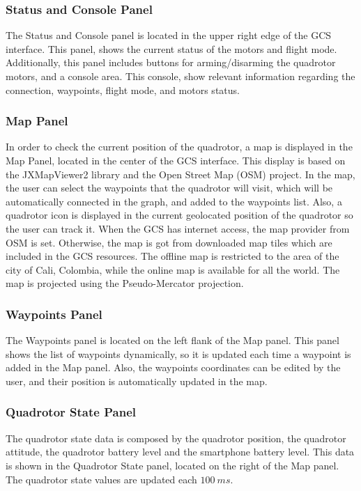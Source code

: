 \subsubsection*{Status and Console Panel}
The Status and Console panel is located in the upper right edge of the GCS interface. This panel, shows the current status of the motors and flight mode. Additionally, this panel includes buttons for arming/disarming the quadrotor motors, and a console area. This console, show relevant information regarding the connection, waypoints, flight mode, and motors status.
\subsubsection*{Map Panel}
In order to check the current position of the quadrotor, a map is displayed in the Map Panel, located in the center of the GCS interface. This display is based on the JXMapViewer2 library and the Open Street Map (OSM) project. In the map, the user can select the waypoints that the quadrotor will visit, which will be automatically connected in the graph, and added to the waypoints list. Also, a quadrotor icon is displayed in the current geolocated position of the quadrotor so the user can track it. When the GCS has internet access, the map provider from OSM is set. Otherwise, the map is got from downloaded map tiles which are included in the GCS resources. The offline map is restricted to the area of the city of Cali, Colombia, while the online map is available for all the world. The map is projected using the Pseudo-Mercator projection.
\subsubsection*{Waypoints Panel}
The Waypoints panel is located on the left flank of the Map panel. This panel shows the list of waypoints dynamically, so it is updated each time a waypoint is added in the Map panel. Also, the waypoints coordinates can be edited by the user, and their position is automatically updated in the map.
\subsubsection*{Quadrotor State Panel}
The quadrotor state data is composed by the quadrotor position, the quadrotor attitude, the quadrotor battery level and the smartphone battery level. This data is shown in the Quadrotor State panel, located on the right of the Map panel. The quadrotor state values are updated each $100\ ms$.
